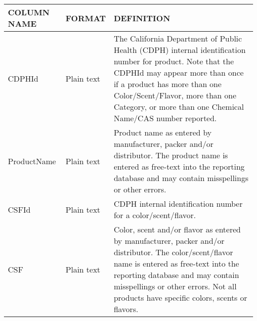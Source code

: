 \begin{table}[]
\begin{tabular}{@{}lll@{}}
\toprule
COLUMN NAME            & FORMAT     & DEFINITION                                                                                                                                                                                                                                                                                                                                                                                                                                                            \\ \midrule
CDPHId                 & Plain text & The California Department of Public Health (CDPH) internal identification number for product. Note that the CDPHId may appear more than once if a product has more than one Color/Scent/Flavor, more than one Category, or more than one Chemical Name/CAS number reported.                                                                                                                                                                                           \\
ProductName            & Plain text & Product name as entered by manufacturer, packer and/or distributor. The product name is entered as free-text into the reporting database and may contain misspellings or other errors.                                                                                                                                                                                                                                                                                \\
CSFId                  & Plain text & CDPH internal identification number for a color/scent/flavor.                                                                                                                                                                                                                                                                                                                                                                                                         \\
CSF                    & Plain text & Color, scent and/or flavor as entered by manufacturer, packer and/or distributor. The color/scent/flavor name is entered as free-text into the reporting database and may contain misspellings or other errors. Not all products have specific colors, scents or flavors.                                                                                                                                                                                             \\

\end{tabular}
\end{table}
